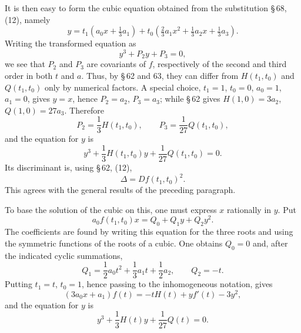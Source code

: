 \documentclass[11pt]{article}
\begin{document}
It is then easy to form the cubic equation obtained from the substitution \S\,68, (12), namely
\begin{equation}
 y=t_1(a_0x+\tfrac13a_1)+t_0\left(\tfrac23a_1x^2+\tfrac13a_2x+\tfrac13a_3\right).
\tag{5}
\end{equation}
Writing the transformed equation as
\[
 y^3+P_2y+P_3=0,
\]
we see that $P_2$ and $P_3$ are covariants of $f$, respectively of the second and third order in both $t$ and $a$. Thus, by \S\,62 and 63, they can differ from $H(t_1,t_0)$ and $Q(t_1,t_0)$ only by numerical factors. A special choice, $t_1=1$, $t_0=0$, $a_0=1$, $a_1=0$, gives $y=x$, hence $P_2=a_2$, $P_3=a_3$; while \S\,62 gives $H(1,0)=3a_2$, $Q(1,0)=27a_3$. Therefore
\[
 P_2=\frac13H(t_1,t_0),
 \qquad
 P_3=\frac1{27}Q(t_1,t_0),
\]
and the equation for $y$ is
\begin{equation}
 y^3+\frac13H(t_1,t_0)y+\frac1{27}Q(t_1,t_0)=0.
\tag{6}
\end{equation}
Its discriminant is, using \S\,62, (12),
\begin{equation}
 \Delta=Df(t_1,t_0)^2.
\tag{8}
\end{equation}
This agrees with the general results of the preceding paragraph.

To base the solution of the cubic on this, one must express $x$ rationally in $y$. Put
\begin{equation}
 a_0f(t_1,t_0)x=Q_0+Q_1y+Q_2y^2.
\tag{9}
\end{equation}
The coefficients are found by writing this equation for the three roots and using the symmetric functions of the roots of a cubic. One obtains $Q_0=0$ and, after the indicated cyclic summations,
\[
 Q_1=\frac12a_0t^2+\frac13a_1t+\frac12a_2,
 \qquad
 Q_2=-t.
\]
Putting $t_1=t$, $t_0=1$, hence passing to the inhomogeneous notation, gives
\begin{equation}
 (3a_0x+a_1)f(t)=-tH(t)+yf'(t)-3y^2,
\tag{10}
\end{equation}
and the equation for $y$ is
\begin{equation}
 y^3+\frac13H(t)y+\frac1{27}Q(t)=0.
\tag{11}
\end{equation}
\end{document}
